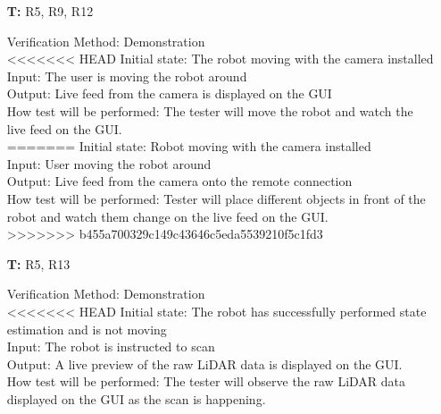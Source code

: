 \documentclass[12pt, titlepage]{article}
\newcounter{tnum} %
\begin{document}
\begin{itemize}
\item[\textbf{T\refstepcounter{tnum}\thetnum:}]{R5, R9, R12\\}

Verification Method: Demonstration\\
<<<<<<< HEAD
Initial state: The robot moving with the camera installed \\
Input: The user is moving the robot around \\
Output: Live feed from the camera is displayed on the GUI \\
How test will be performed: The tester will move the robot and watch the live feed on the GUI.\\
=======
Initial state: Robot moving with the camera installed \\
Input: User moving the robot around \\
Output: Live feed from the camera onto the remote connection \\
How test will be performed: Tester will place different objects in front of the robot and watch them change on the live feed on the GUI.\\
>>>>>>> b455a700329c149c43646c5eda5539210f5c1fd3

\item[\textbf{T\refstepcounter{tnum}\thetnum:}]{R5, R13\\}

Verification Method: Demonstration\\
<<<<<<< HEAD
Initial state: The robot has successfully performed state estimation and is not moving\\
Input: The robot is instructed to scan \\
Output: A live preview of the raw LiDAR data is displayed on the GUI.\\
How test will be performed: The tester will observe the raw LiDAR data displayed on the GUI as the scan is happening.\\


\end{itemize}
\end{document}

